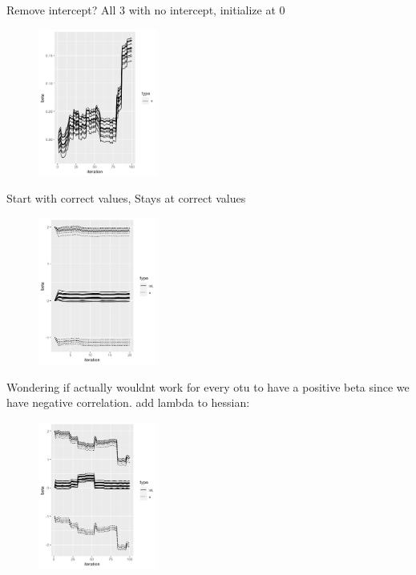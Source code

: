 \documentclass[10pt]{article}
\theoremstyle{definition}
\begin{document}
Remove intercept?
All 3 with no intercept, initialize at 0
\begin{figure}[!htb]
	\centering
	\includegraphics[width=0.35\textwidth]{img/Temp_week_journal-b33358ce.png}
	\caption{}
	\label{}
\end{figure}

Start with correct values,
Stays at correct values
\begin{figure}[!htb]
	\centering
	\includegraphics[width=0.35\textwidth]{img/Temp_week_journal-24c232f1.png}
	\caption{}
	\label{}
\end{figure}

Wondering if actually wouldnt work for every otu to have a positive beta since we have negative correlation.
 add lambda to hessian:

\begin{figure}[!htb]
	\centering
	\includegraphics[width=0.35\textwidth]{img/Temp_week_journal-8e219e90.png}
	\caption{}
	\label{}
\end{figure}
\end{document}
